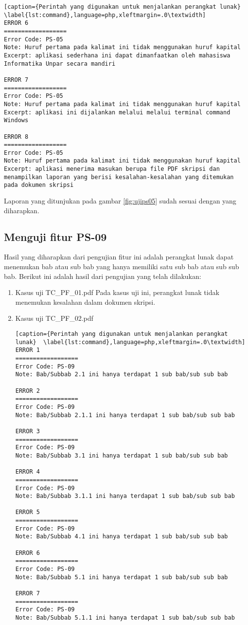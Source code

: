 \begin{enumerate}
\begin{lstlisting}[caption={Perintah yang digunakan untuk menjalankan perangkat lunak}	\label{lst:command},language=php,xleftmargin=.0\textwidth]
ERROR 6
==================
Error Code: PS-05
Note: Huruf pertama pada kalimat ini tidak menggunakan huruf kapital
Excerpt: aplikasi sederhana ini dapat dimanfaatkan oleh mahasiswa Informatika Unpar secara mandiri

ERROR 7
==================
Error Code: PS-05
Note: Huruf pertama pada kalimat ini tidak menggunakan huruf kapital
Excerpt: aplikasi ini dijalankan melalui melalui terminal command Windows 

ERROR 8
==================
Error Code: PS-05
Note: Huruf pertama pada kalimat ini tidak menggunakan huruf kapital
Excerpt: aplikasi menerima masukan berupa file PDF skripsi dan menampilkan laporan yang berisi kesalahan-kesalahan yang ditemukan pada dokumen skripsi
\end{lstlisting}
\end{enumerate}

Laporan yang ditunjukan pada gambar \ref{fig:ujips05} sudah sesuai dengan yang diharapkan.

\subsection{Menguji fitur PS-09}
Hasil yang diharapkan dari pengujian fitur ini adalah perangkat lunak dapat menemukan bab atau sub bab yang hanya memiliki satu sub bab atau sub sub bab. Berikut ini adalah hasil dari pengujian yang telah dilakukan:

\begin{enumerate}
	\item Kasus uji TC\_PF\_01.pdf
	Pada kasus uji ini, perangkat lunak tidak menemukan kesalahan dalam dokumen skripsi.
	
	\item Kasus uji TC\_PF\_02.pdf
	
\begin{lstlisting}[caption={Perintah yang digunakan untuk menjalankan perangkat lunak}	\label{lst:command},language=php,xleftmargin=.0\textwidth]
ERROR 1
==================
Error Code: PS-09
Note: Bab/Subbab 2.1 ini hanya terdapat 1 sub bab/sub sub bab

ERROR 2
==================
Error Code: PS-09
Note: Bab/Subbab 2.1.1 ini hanya terdapat 1 sub bab/sub sub bab

ERROR 3
==================
Error Code: PS-09
Note: Bab/Subbab 3.1 ini hanya terdapat 1 sub bab/sub sub bab

ERROR 4
==================
Error Code: PS-09
Note: Bab/Subbab 3.1.1 ini hanya terdapat 1 sub bab/sub sub bab

ERROR 5
==================
Error Code: PS-09
Note: Bab/Subbab 4.1 ini hanya terdapat 1 sub bab/sub sub bab

ERROR 6
==================
Error Code: PS-09
Note: Bab/Subbab 5.1 ini hanya terdapat 1 sub bab/sub sub bab

ERROR 7
==================
Error Code: PS-09
Note: Bab/Subbab 5.1.1 ini hanya terdapat 1 sub bab/sub sub bab
\end{lstlisting}
\end{enumerate}

